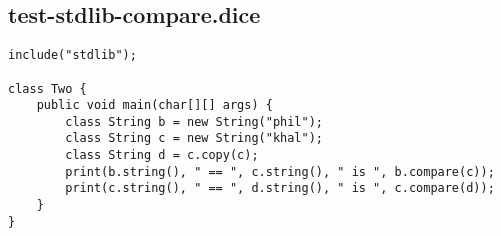\subsection{test-stdlib-compare.dice}
\begin{verbatim}
include("stdlib");

class Two {
	public void main(char[][] args) {
        class String b = new String("phil");
        class String c = new String("khal");
        class String d = c.copy(c);
        print(b.string(), " == ", c.string(), " is ", b.compare(c));
        print(c.string(), " == ", d.string(), " is ", c.compare(d));
	}
}

\end{verbatim}